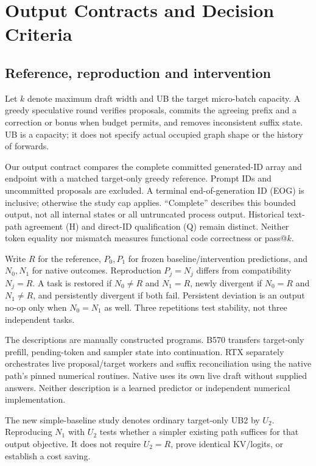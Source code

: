 \section{Output Contracts and Decision Criteria}
\label{sec:framework}
\subsection{Reference, reproduction and intervention}
Let $k$ denote maximum draft width and UB the target micro-batch capacity. A greedy speculative round verifies proposals, commits the agreeing prefix and a correction or bonus when budget permits, and removes inconsistent suffix state. UB is a capacity; it does not specify actual occupied graph shape or the history of forwards.

Our output contract compares the complete committed generated-ID array and endpoint with a matched target-only greedy reference. Prompt IDs and uncommitted proposals are excluded. A terminal end-of-generation ID (EOG) is inclusive; otherwise the study cap applies. ``Complete'' describes this bounded output, not all internal states or all untruncated process output. Historical text-path agreement (H) and direct-ID qualification (Q) remain distinct. Neither token equality nor mismatch measures functional code correctness or pass@$k$.

Write $R$ for the reference, $P_0,P_1$ for frozen baseline/intervention predictions, and $N_0,N_1$ for native outcomes. Reproduction $P_j=N_j$ differs from compatibility $N_j=R$. A task is restored if $N_0\ne R$ and $N_1=R$, newly divergent if $N_0=R$ and $N_1\ne R$, and persistently divergent if both fail. Persistent deviation is an output no-op only when $N_0=N_1$ as well. Three repetitions test stability, not three independent tasks.

The descriptions are manually constructed programs. B570 transfers target-only prefill, pending-token and sampler state into continuation. RTX separately orchestrates live proposal/target workers and suffix reconciliation using the native path's pinned numerical routines. Native uses its own live draft without supplied answers. Neither description is a learned predictor or independent numerical implementation.

The new simple-baseline study denotes ordinary target-only UB2 by $U_2$. Reproducing $N_1$ with $U_2$ tests whether a simpler existing path suffices for that output objective. It does not require $U_2=R$, prove identical KV/logits, or establish a cost saving.


